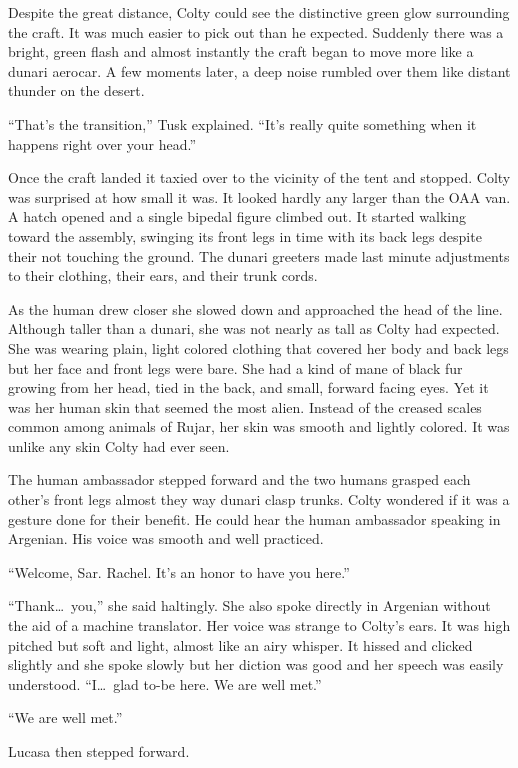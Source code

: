 Despite the great distance, Colty could see the distinctive green glow surrounding the craft. It
was much easier to pick out than he expected. Suddenly there was a bright, green flash and
almost instantly the craft began to move more like a dunari aerocar. A few moments later, a deep
noise rumbled over them like distant thunder on the desert.

``That's the transition,'' Tusk explained. ``It's really quite something when it happens right
over your head.''

Once the craft landed it taxied over to the vicinity of the tent and stopped. Colty was
surprised at how small it was. It looked hardly any larger than the OAA van. A hatch opened and
a single bipedal figure climbed out. It started walking toward the assembly, swinging its front
legs in time with its back legs despite their not touching the ground. The dunari greeters made
last minute adjustments to their clothing, their ears, and their trunk cords.

As the human drew closer she slowed down and approached the head of the line. Although taller
than a dunari, she was not nearly as tall as Colty had expected. She was wearing plain, light
colored clothing that covered her body and back legs but her face and front legs were bare. She
had a kind of mane of black fur growing from her head, tied in the back, and small, forward
facing eyes. Yet it was her human skin that seemed the most alien. Instead of the creased scales
common among animals of Rujar, her skin was smooth and lightly colored. It was unlike any skin
Colty had ever seen.

The human ambassador stepped forward and the two humans grasped each other's front legs almost
they way dunari clasp trunks. Colty wondered if it was a gesture done for their benefit. He
could hear the human ambassador speaking in Argenian. His voice was smooth and well practiced.

``Welcome, Sar. Rachel. It's an honor to have you here.''

``Thank\ldots\ you,'' she said haltingly. She also spoke directly in Argenian without the aid of
a machine translator. Her voice was strange to Colty's ears. It was high pitched but soft and
light, almost like an airy whisper. It hissed and clicked slightly and she spoke slowly but her
diction was good and her speech was easily understood. ``I\ldots\ glad to-be here. We are well
met.''

``We are well met.''

Lucasa then stepped forward. 

